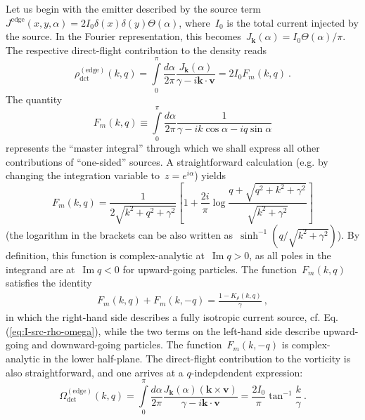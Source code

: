 \documentclass[preprint,aps,eqsecnum, prb]{revtex4-1}
\renewcommand{\Im}{\mathop{\mathrm{Im}}\nolimits}
\newcommand{\dct}[1]{{#1}_\mathrm{dct}}
\begin{document}
Let us begin with the emitter described by the source term
$J^{\mathrm{edge}}(x, y, \alpha) = 2 I_0 \delta(x)\delta(y) \Theta(\alpha)$,
where~$I_0$ is the total current injected by the source. In the Fourier
representation, this becomes~$J_{\bm k}(\alpha) = I_0 \Theta(\alpha) / \pi$.
The respective direct-flight contribution to the density reads
\begin{equation}
   \label{eq:source-surf-rho-app}
  \dct{\rho}^{\mathrm{(edge)}}(k, q)
  = \int\limits_{0}^{\pi}
         \frac{d\alpha}{2\pi} \frac{J_{\bm k}(\alpha)}{\gamma
                               - i {\bm k} \cdot {\bm v}} = 2 I_0 F_m(k, q) \ .
\end{equation}
The quantity
\begin{equation}
F_m(k, q) \equiv \int\limits_{0}^{\pi}  \frac{d\alpha}{2\pi}
               \frac{1}{\gamma - i k \cos \alpha - i q \sin\alpha}
\end{equation}
represents the ``master integral'' through which we shall express
all other contributions of ``one-sided'' sources.
A straightforward calculation (e.g. by changing the
integration variable to~$z = e^{i\alpha}$) yields
\begin{equation}
  \label{eq:source-fm-def}
  F_m(k, q) = \frac{1}{2\sqrt{k^2 + q^2 + \gamma^2}}
  \left[1 + \frac{2i}{\pi}
               \log\frac{q + \sqrt{q^2 + k^2 + \gamma^2}}{\sqrt{k^2 + \gamma^2}}\right]
\end{equation}
(the logarithm in the brackets can be also written
as~$\sinh^{-1} (q / \sqrt{k^2 + \gamma^2})$). By definition, this function
is complex-analytic at~$\Im q > 0$, as all poles in the integrand are
at~$\Im q < 0$ for upward-going particles. The function~$F_m(k, q)$
satisfies the identity
\begin{align}
  \label{eq:fm-identity}
  F_m(k, q) + F_m(k, -q) = \frac{1 - K_\rho(k, q)}{\gamma} \ ,
\end{align}
in which the right-hand side describes a fully isotropic current source,
cf. Eq.(\ref{eq:I-src-rho-omega}), while the two terms on the
left-hand side describe upward-going and downward-going particles.
The function~$F_m(k, -q)$ is complex-analytic in the lower half-plane.
The direct-flight contribution to the vorticity is also straightforward,
and one arrives at a  $q$-indepdendent expression:
\begin{equation}
  \label{eq:source-surf-omega-app}
  \dct{\Omega}^{\mathrm{(edge)}}(k, q) =
  \int\limits_{0}^{\pi} \frac{d\alpha}{2\pi} \frac{J_{\bm k}(\alpha)
        ({\bm k} \times {\bm v})}{\gamma - i {\bm k} \cdot {\bm v}}
    = \frac{2 I_0}{\pi} \tan^{-1} \frac{k}{\gamma}\ .
\end{equation}
\end{document}
